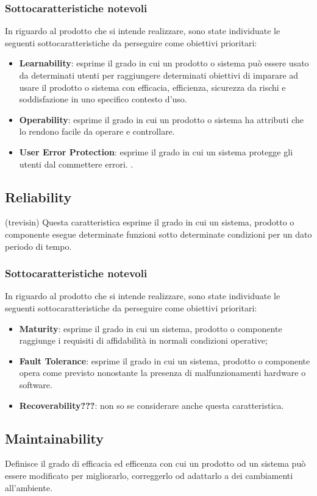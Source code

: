 \subsubsection{Sottocaratteristiche notevoli}
In riguardo al prodotto che si intende realizzare, sono state individuate le seguenti sottocaratteristiche da perseguire come obiettivi prioritari:
\begin{itemize}
	\item{\textbf{Learnability}}: esprime il grado in cui un prodotto o sistema può essere usato da determinati utenti per raggiungere determinati obiettivi di imparare ad usare il prodotto o sistema  con efficacia, efficienza, sicurezza da rischi e soddisfazione in uno specifico contesto d'uso.
	\item{\textbf{Operability}}: esprime il grado in cui un prodotto o sistema ha attributi che lo rendono facile da operare e controllare.
	\item{\textbf{User Error Protection}}: esprime il grado in cui un sistema protegge gli utenti dal commettere errori.
	.
\end{itemize}

\subsection{Reliability} (trevisin)
Questa caratteristica esprime il grado in cui un sistema, prodotto o componente esegue determinate funzioni sotto determinate condizioni per un dato periodo di tempo.
\subsubsection{Sottocaratteristiche notevoli}
In riguardo al prodotto che si intende realizzare, sono state individuate le seguenti sottocaratteristiche da perseguire come obiettivi prioritari: 
\begin{itemize}
	\item{\textbf{Maturity}}: esprime il grado in cui un sistema, prodotto o componente raggiunge i requisiti di affidabilità in normali condizioni operative;
	\item{\textbf{Fault Tolerance}}: esprime il grado in cui un sistema, prodotto o componente opera come previsto nonostante la presenza di malfunzionamenti hardware o software.
	\item{\textbf{Recoverability???}}: non so se considerare anche questa caratteristica.
\end{itemize}

\subsection{Maintainability}
Definisce il grado di efficacia ed efficenza con cui un prodotto od un sistema può essere modificato per migliorarlo, correggerlo od adattarlo a dei cambiamenti all'ambiente. 

